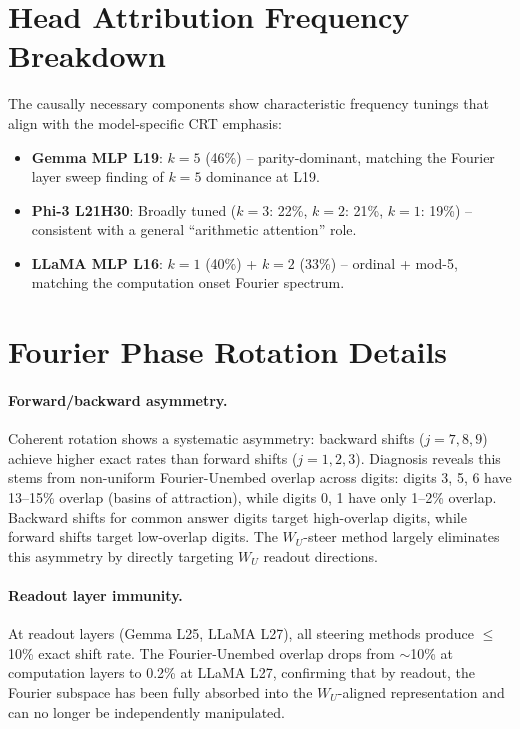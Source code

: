 \section{Head Attribution Frequency Breakdown}
\label{app:freq_breakdown}

The causally necessary components show characteristic frequency tunings that align with the model-specific CRT emphasis:

\begin{itemize}
    \item \textbf{Gemma MLP L19}: $k{=}5$ (46\%) -- parity-dominant, matching the Fourier layer sweep finding of $k{=}5$ dominance at L19.
    \item \textbf{Phi-3 L21H30}: Broadly tuned ($k{=}3$: 22\%, $k{=}2$: 21\%, $k{=}1$: 19\%) -- consistent with a general ``arithmetic attention'' role.
    \item \textbf{LLaMA MLP L16}: $k{=}1$ (40\%) + $k{=}2$ (33\%) -- ordinal + mod-5, matching the computation onset Fourier spectrum.
\end{itemize}

\section{Fourier Phase Rotation Details}
\label{app:rotation_details}

\paragraph{Forward/backward asymmetry.} Coherent rotation shows a systematic asymmetry: backward shifts ($j{=}7,8,9$) achieve higher exact rates than forward shifts ($j{=}1,2,3$). Diagnosis reveals this stems from non-uniform Fourier-Unembed overlap across digits: digits 3, 5, 6 have 13--15\% overlap (basins of attraction), while digits 0, 1 have only 1--2\% overlap. Backward shifts for common answer digits target high-overlap digits, while forward shifts target low-overlap digits. The $W_U$-steer method largely eliminates this asymmetry by directly targeting $W_U$ readout directions.

\paragraph{Readout layer immunity.} At readout layers (Gemma L25, LLaMA L27), all steering methods produce $\leq$10\% exact shift rate. The Fourier-Unembed overlap drops from $\sim$10\% at computation layers to 0.2\% at LLaMA L27, confirming that by readout, the Fourier subspace has been fully absorbed into the $W_U$-aligned representation and can no longer be independently manipulated.

